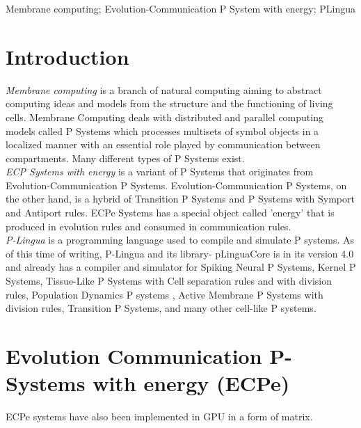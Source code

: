 \documentclass{acm_proc_article-sp}
\begin{document}
 Membrane computing; Evolution-Communication P System with energy; PLingua
    
\section{Introduction}
\indent\textit{Membrane computing}\cite{p-system} is a branch of natural computing aiming to abstract computing ideas and models from the structure and the functioning of living cells. Membrane Computing deals with distributed and parallel computing models called P Systems which processes multisets of symbol objects in a localized manner with an essential role played by communication between compartments. Many different types of P Systems exist.\\
\indent \textit{ECP Systems with energy}\cite{ecpe_no-antiport} is a variant of P Systems that originates from Evolution-Communication P Systems. Evolution-Communication P Systems, on the other hand, is a hybrid of Transition P Systems and P Systems with Symport and Antiport rules. ECPe Systems has a special object called 'energy' that is produced in evolution rules and consumed in communication rules.\\
\indent \textit{P-Lingua} \cite{psystem-website} is a programming language used to compile and simulate P systems. As of this time of writing, P-Lingua and its library- pLinguaCore is in its version 4.0 and already has a compiler and simulator for Spiking Neural P Systems, Kernel P Systems, Tissue-Like P Systems with Cell separation rules and with division rules, Population Dynamics P systems , Active Membrane P Systems with division rules, Transition P Systems, and many other cell-like P systems.

\section{Evolution Communication P-Systems with energy (ECPe)}
 ECPe systems have also been implemented in GPU in a form of matrix.
     
\end{document}
